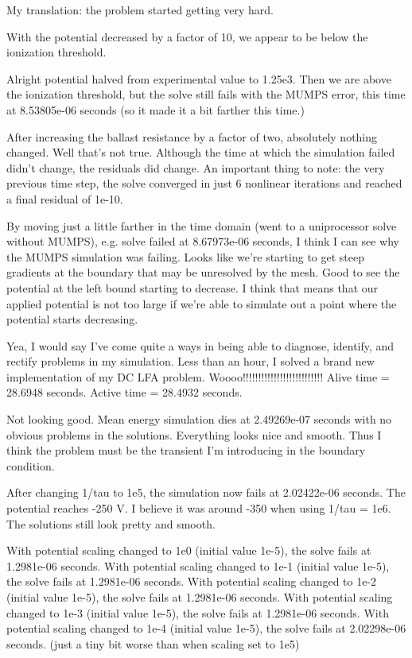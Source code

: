 {My translation: the problem started getting very hard.

With the potential decreased by a factor of 10, we appear to be below the ionization threshold.

Alright potential halved from experimental value to 1.25e3. Then we are above the ionization threshold, but the solve still fails with the MUMPS error, this time at 8.53805e-06 seconds (so it made it a bit farther this time.)

After increasing the ballast resistance by a factor of two, absolutely nothing changed. Well that's not true. Although the time at which the simulation failed didn't change, the residuals did change. An important thing to note: the very previous time step, the solve converged in just 6 nonlinear iterations and reached a final residual of 1e-10.

By moving just a little farther in the time domain (went to a uniprocessor solve without MUMPS), e.g. solve failed at 8.67973e-06 seconds, I think I can see why the MUMPS simulation was failing. Looks like we're starting to get steep gradients at the boundary that may be unresolved by the mesh. Good to see the potential at the left bound starting to decrease. I think that means that our applied potential is not too large if we're able to simulate out a point where the potential starts decreasing.

Yea, I would say I've come quite a ways in being able to diagnose, identify, and rectify problems in my simulation. Less than an hour, I solved a brand new implementation of my DC LFA problem. Woooo!!!!!!!!!!!!!!!!!!!!!!!!!! Alive time = 28.6948 seconds. Active time = 28.4932 seconds.

Not looking good. Mean energy simulation dies at 2.49269e-07 seconds with no obvious problems in the solutions. Everything looks nice and smooth. Thus I think the problem must be the transient I'm introducing in the boundary condition.

After changing 1/tau to 1e5, the simulation now fails at 2.02422e-06 seconds. The potential reaches -250 V. I believe it was around -350 when using 1/tau = 1e6. The solutions still look pretty and smooth.

With potential scaling changed to 1e0 (initial value 1e-5), the solve fails at 1.2981e-06 seconds.
With potential scaling changed to 1e-1 (initial value 1e-5), the solve fails at 1.2981e-06 seconds.
With potential scaling changed to 1e-2 (initial value 1e-5), the solve fails at 1.2981e-06 seconds.
With potential scaling changed to 1e-3 (initial value 1e-5), the solve fails at 1.2981e-06 seconds.
With potential scaling changed to 1e-4 (initial value 1e-5), the solve fails at 2.02298e-06 seconds. (just a tiny bit worse than when scaling set to 1e5)

}
